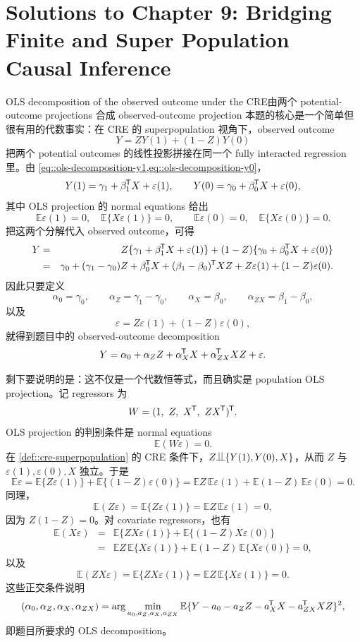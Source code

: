 \chapter{Solutions to Chapter 9: Bridging Finite and Super Population Causal Inference}
\label{sol:chapter09}

\begin{exercisesolution}{OLS decomposition of the observed outcome under the CRE}{由两个 potential-outcome projections 合成 observed-outcome projection}
本题的核心是一个简单但很有用的代数事实：在 CRE 的 superpopulation 视角下，observed outcome
\[
Y=ZY(1)+(1-Z)Y(0)
\]
把两个 potential outcomes 的线性投影拼接在同一个 fully interacted regression 里。由 \cref{eq::ols-decomposition-y1,eq::ols-decomposition-y0}，
\[
Y(1)=\gamma_1+\beta_1^{\mkern-1.5mu\mathsf{T}} X+\varepsilon(1),
\qquad
Y(0)=\gamma_0+\beta_0^{\mkern-1.5mu\mathsf{T}} X+\varepsilon(0),
\]
其中 OLS projection 的 normal equations 给出
\[
\mathbb{E}\varepsilon(1)=0,\quad
\mathbb{E}\{X\varepsilon(1)\}=0,\qquad
\mathbb{E}\varepsilon(0)=0,\quad
\mathbb{E}\{X\varepsilon(0)\}=0.
\]
把这两个分解代入 observed outcome，可得
\begin{eqnarray*}
Y
&=&Z\{\gamma_1+\beta_1^{\mkern-1.5mu\mathsf{T}} X+\varepsilon(1)\}
 +(1-Z)\{\gamma_0+\beta_0^{\mkern-1.5mu\mathsf{T}} X+\varepsilon(0)\}\\
&=&\gamma_0+(\gamma_1-\gamma_0)Z
  +\beta_0^{\mkern-1.5mu\mathsf{T}} X+(\beta_1-\beta_0)^{\mkern-1.5mu\mathsf{T}} XZ
  +Z\varepsilon(1)+(1-Z)\varepsilon(0).
\end{eqnarray*}
因此只要定义
\[
\alpha_0=\gamma_0,\qquad
\alpha_Z=\gamma_1-\gamma_0,\qquad
\alpha_X=\beta_0,\qquad
\alpha_{ZX}=\beta_1-\beta_0,
\]
以及
\[
\varepsilon=Z\varepsilon(1)+(1-Z)\varepsilon(0),
\]
就得到题目中的 observed-outcome decomposition
\[
Y=\alpha_0+\alpha_ZZ+\alpha_X^{\mkern-1.5mu\mathsf{T}} X+\alpha_{ZX}^{\mkern-1.5mu\mathsf{T}} XZ+\varepsilon.
\]

剩下要说明的是：这不仅是一个代数恒等式，而且确实是 population OLS projection。记 regressors 为
\[
W=(1,\ Z,\ X\tran,\ ZX\tran)\tran.
\]
OLS projection 的判别条件是 normal equations
\[
\mathbb{E}(W\varepsilon)=0.
\]
在 \cref{def::cre-superpopulation} 的 CRE 条件下，$Z\ind\{Y(1),Y(0),X\}$，从而 $Z$ 与 $\varepsilon(1),\varepsilon(0),X$ 独立。于是
\[
\mathbb{E}\varepsilon
=\mathbb{E}\{Z\varepsilon(1)\}
 +\mathbb{E}\{(1-Z)\varepsilon(0)\}
=\mathbb{E}Z\,\mathbb{E}\varepsilon(1)
 +\mathbb{E}(1-Z)\,\mathbb{E}\varepsilon(0)
=0.
\]
同理，
\[
\mathbb{E}(Z\varepsilon)
=\mathbb{E}\{Z\varepsilon(1)\}
=\mathbb{E}Z\,\mathbb{E}\varepsilon(1)
=0,
\]
因为 $Z(1-Z)=0$。对 covariate regressors，也有
\begin{eqnarray*}
\mathbb{E}(X\varepsilon)
&=&\mathbb{E}\{ZX\varepsilon(1)\}
  +\mathbb{E}\{(1-Z)X\varepsilon(0)\}\\
&=&\mathbb{E}Z\,\mathbb{E}\{X\varepsilon(1)\}
  +\mathbb{E}(1-Z)\,\mathbb{E}\{X\varepsilon(0)\}
=0,
\end{eqnarray*}
以及
\[
\mathbb{E}(ZX\varepsilon)
=\mathbb{E}\{ZX\varepsilon(1)\}
=\mathbb{E}Z\,\mathbb{E}\{X\varepsilon(1)\}
=0.
\]
这些正交条件说明
\[
(\alpha_0,\alpha_Z,\alpha_X,\alpha_{ZX})
=\arg\min_{a_0,a_Z,a_X,a_{ZX}}
\mathbb{E}\{Y-a_0-a_ZZ-a_X^{\mkern-1.5mu\mathsf{T}} X-a_{ZX}^{\mkern-1.5mu\mathsf{T}} XZ\}^2,
\]
即题目所要求的 OLS decomposition。


\end{exercisesolution}
